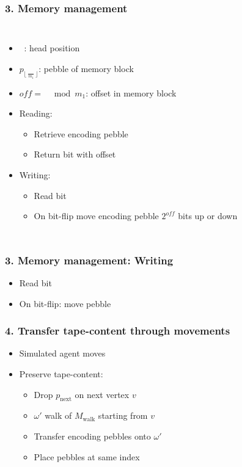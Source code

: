 \documentclass{beamer}
\DeclareMathOperator{\Thead}{T_{\text{head}}}
\begin{document}
\begin{frame}
  \frametitle{3. Memory management}
  \begin{columns}
    \begin{itemize}
      \item $\Thead$: head position
      \item $p_{\lfloor\frac{\Thead}{m_{1}}\rfloor}$: pebble of memory block
      \item $\mathit{off} = \Thead\mod m_{1}$: offset in memory block
      \item Reading:
        \begin{itemize}
          \item Retrieve encoding pebble
          \item Return bit with offset
        \end{itemize}
      \item Writing:
        \begin{itemize}
          \item Read bit
          \item On bit-flip move encoding pebble $2^{\mathit{off}}$ bits up or
            down
        \end{itemize}
    \end{itemize}
    \resizebox{\textwidth}{!}{}
    \resizebox{\textwidth}{!}{}
  \end{columns}
\end{frame}

\begin{frame}
  \frametitle{3. Memory management: Writing}
  \begin{itemize}
    \item Read bit
    \item On bit-flip: move pebble
  \end{itemize}
  \resizebox{\textwidth}{!}{}
\end{frame}

\begin{frame}
  \frametitle{4. Transfer tape-content through movements}
  \begin{itemize}
    \item Simulated agent moves
    \item Preserve tape-content:
      \begin{itemize}
        \item Drop $p_{\text{next}}$ on next vertex $v$
        \item $\omega'$ walk of $M_{\text{walk}}$ starting from $v$
        \item Transfer encoding pebbles onto $\omega'$
        \item Place pebbles at same index
      \end{itemize}
  \end{itemize}
\end{frame}
\end{document}
